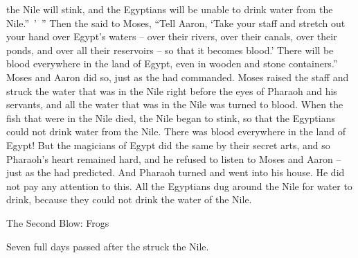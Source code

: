 {the Nile
will stink,
and the Egyptians
will be unable
to drink
water
from
the Nile.” ’ ”
Then the
{}
said to
Moses,
“Tell
Aaron,
‘Take
your staff
and stretch
out your hand
over
Egypt’s
waters
– over
their rivers,
over
their canals,
over
their ponds,
and over
all
their reservoirs –
so that it becomes
blood.’
There will be
blood
everywhere
in the land
of Egypt,
even in wooden
and stone containers.”
Moses
and Aaron
did
so,
just
as the
{}
had commanded.
Moses raised
the staff
and struck
the
water
that
was in the Nile
right before
the eyes
of Pharaoh
and his servants,
and all
the water
that
was in the Nile
was turned
to blood.
When the fish
that
were in the Nile
died,
the Nile
began to stink,
so that the Egyptians
could
not
drink
water
from
the Nile.
There was
blood
everywhere
in the land
of Egypt!
But the magicians
of Egypt
did
the same
by their secret arts,
and so Pharaoh’s
heart
remained hard, and he refused
to listen
to
Moses
and Aaron –
just
as the
{}
had predicted.
And Pharaoh
turned
and went
into
his house.
He did not
pay
any attention
to this.
All
the Egyptians
dug
around
the Nile
for water
to drink,
because
they could
not
drink
the water
of the Nile.
\par }{\SH The Second Blow: Frogs
\par }{\PP {}Seven
full
days
passed after
the {}
struck
the Nile.

}
